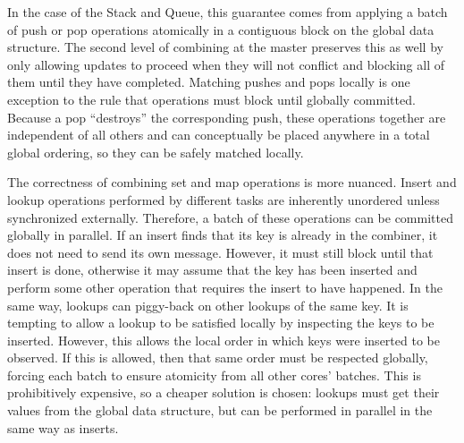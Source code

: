In the case of the Stack and Queue, this guarantee comes from applying a batch of push or pop operations atomically in a contiguous block on the global data structure. The second level of combining at the master preserves this as well by only allowing updates to proceed when they will not conflict and blocking all of them until they have completed.
Matching pushes and pops locally is one exception to the rule that operations must block until globally committed. Because a pop ``destroys'' the corresponding push, these operations together are independent of all others and can conceptually be placed anywhere in a total global ordering, so they can be safely matched locally.

The correctness of combining set and map operations is more nuanced.
Insert and lookup operations performed by different tasks are inherently unordered unless synchronized externally.
Therefore, a batch of these operations can be committed globally in parallel.
If an insert finds that its key is already in the combiner, it does not need to send its own message. However, it must still block until that insert is done, otherwise it may assume that the key has been inserted and perform some other operation that requires the insert to have happened.
In the same way, lookups can piggy-back on other lookups of the same key.
It is tempting to allow a lookup to be satisfied locally by inspecting the keys to be inserted.
However, this allows the local order in which keys were inserted to be observed.
If this is allowed, then that same order must be respected globally, forcing each batch to ensure atomicity from all other cores' batches. This is prohibitively expensive, so a cheaper solution is chosen: lookups must get their values from the global data structure, but can be performed in parallel in the same way as inserts.



